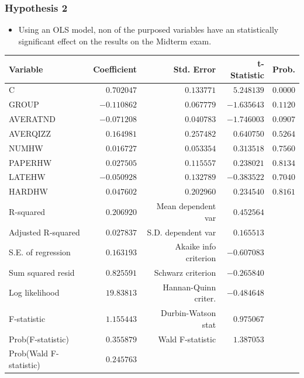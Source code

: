 \documentclass{beamer} %
\theoremstyle{definition}
\begin{document}
	\begin{frame}
		\frametitle{Hypothesis 2}
		\centering
		\begin{itemize}
			\item Using an OLS model, non  of the purposed variables have an statistically significant effect on the results on the Midterm exam.
		\end{itemize}
		\begin{table}[!htbp]
			\centering
			\tiny
			\begin{tabular}{lrrrr}
				\hline
				Variable & Coefficient & Std. Error & t-Statistic & Prob. \\
				\hline
				C & $0.702047$  & $0.133771$  & $5.248139$  & $0.0000$ \\
				GROUP & $-0.110862$ & $0.067779$  & $-1.635643$ & $0.1120$ \\
				AVERATND & $-0.071208$ & $0.040783$  & $-1.746003$ & $0.0907$ \\
				AVERQIZZ & $0.164981$  & $0.257482$  & $0.640750$  & $0.5264$ \\
				NUMHW & $0.016727$  & $0.053354$  & $0.313518$  & $0.7560$ \\
				PAPERHW & $0.027505$  & $0.115557$  & $0.238021$  & $0.8134$ \\
				LATEHW & $-0.050928$ & $0.132789$  & $-0.383522$ & $0.7040$ \\
				HARDHW & $0.047602$  & $0.202960$  & $0.234540$  & $0.8161$ \\
				\hline
				R-squared & $0.206920$ & Mean dependent var & $0.452564$ &  \\
				Adjusted R-squared & $0.027837$ & S.D. dependent var & $0.165513$ &  \\
				S.E. of regression & $0.163193$ & Akaike info criterion & $-0.607083$ &  \\
				Sum squared resid & $0.825591$ & Schwarz criterion & $-0.265840$ &  \\
				Log likelihood & $19.83813$ & Hannan-Quinn criter. & $-0.484648$ &  \\
				F-statistic & $1.155443$ & Durbin-Watson stat & $0.975067$ &  \\
				Prob(F-statistic) & $0.355879$ & Wald F-statistic & $1.387053$ &  \\
				Prob(Wald F-statistic) & $0.245763$ &  &  &  \\
				\hline
			\end{tabular}
		\end{table}
	\end{frame}
	
\end{document}
